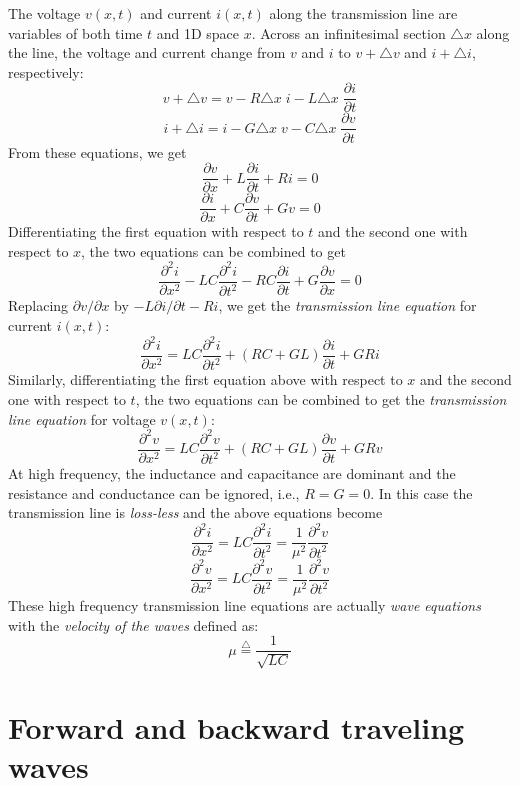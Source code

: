 The voltage $v(x,t)$ and current $i(x,t)$ along the transmission
line are variables of both time $t$ and 1D space $x$. 
Across an
infinitesimal section $\triangle x$ along the line, the voltage and 
current change from $v$ and $i$ to $v+\triangle v$ and 
$i+\triangle i$, respectively: 
\[ v+\triangle v=v-R\triangle x\; i-L\triangle x \;\frac{\partial i}{\partial t}	\]
\[ i+\triangle i=i-G\triangle x\; v-C\triangle x\; \frac{\partial v}{\partial t}	\]
From these equations, we get
\[
\frac{\partial v}{\partial x}+L \frac{\partial i}{\partial t}+Ri=0
\]
\[
\frac{\partial i}{\partial x}+C \frac{\partial v}{\partial t}+Gv=0
\]
Differentiating the first equation with respect to $t$ and the second one
with respect to $x$, the two equations can be combined to get 
\[	\frac{\partial^2 i}{\partial x^2}-LC\frac{\partial^2 i}{\partial t^2}
	-RC\frac{\partial i}{\partial t}+G\frac{\partial v}{\partial x}=0
\]
Replacing $\partial v/\partial x$ by $-L \partial i/\partial t-Ri$, we get
the {\em transmission line equation} for current $i(x,t)$:
\[	\frac{\partial^2 i}{\partial x^2}=LC\frac{\partial^2 i}{\partial t^2}
	+(RC+GL)\frac{\partial i}{\partial t}+GRi
\]
Similarly, differentiating the first equation above with respect to $x$ and 
the second one with respect to $t$, the two equations can be combined 
to get the {\em transmission line equation} for voltage $v(x,t)$:
\[	\frac{\partial^2 v}{\partial x^2}=LC\frac{\partial^2 v}{\partial t^2}
	+(RC+GL)\frac{\partial v}{\partial t}+GRv
\]
At high frequency, the inductance and capacitance are dominant and the 
resistance and conductance can be ignored, i.e., $R=G=0$. In this case the
transmission line is {\em loss-less} and the above equations become
\[
\frac{\partial^2 i}{\partial x^2}=LC \frac{\partial^2 i}{\partial t^2}=\frac{1}{\mu^2} \frac{\partial^2 v}{\partial t^2}
\]
\[
\frac{\partial^2 v}{\partial x^2}=LC \frac{\partial^2 v}{\partial t^2}=\frac{1}{\mu^2} \frac{\partial^2 v}{\partial t^2}
\]
These high frequency transmission line equations are actually {\em wave 
equations} with the {\em velocity of the waves} defined as:
\[	\mu \stackrel{\triangle}{=} \frac{1}{\sqrt{LC}}	\]

\newpage
\section*{Forward and backward traveling waves}

